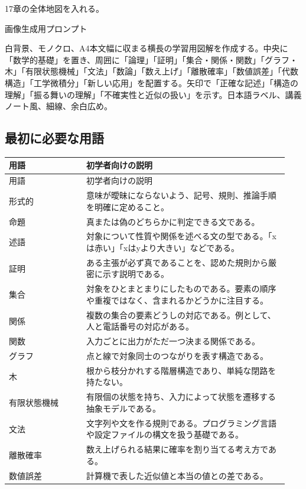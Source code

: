 \documentclass[uplatex,dvipdfmx,a4paper,10pt]{jsarticle}
\begin{document}
\begin{todobox}
17章の全体地図を入れる。

画像生成用プロンプト

白背景、モノクロ、A4本文幅に収まる横長の学習用図解を作成する。中央に「数学的基礎」を置き、周囲に「論理」「証明」「集合・関係・関数」「グラフ・木」「有限状態機械」「文法」「数論」「数え上げ」「離散確率」「数値誤差」「代数構造」「工学微積分」「新しい応用」を配置する。矢印で「正確な記述」「構造の理解」「振る舞いの理解」「不確実性と近似の扱い」を示す。日本語ラベル、講義ノート風、細線、余白広め。
\end{todobox}
\subsection{最初に必要な用語}
\begin{longtable}{>{\raggedright\arraybackslash}p{0.26\linewidth} >{\raggedright\arraybackslash}p{0.68\linewidth}}
\toprule
用語 & 初学者向けの説明 \\
\midrule
\endfirsthead
\toprule
用語 & 初学者向けの説明 \\
\midrule
\endhead
形式的 & 意味が曖昧にならないよう、記号、規則、推論手順を明確に定めること。 \\
命題 & 真または偽のどちらかに判定できる文である。 \\
述語 & 対象について性質や関係を述べる文の型である。「xは赤い」「xはyより大きい」などである。 \\
証明 & ある主張が必ず真であることを、認めた規則から厳密に示す説明である。 \\
集合 & 対象をひとまとまりにしたものである。要素の順序や重複ではなく、含まれるかどうかに注目する。 \\
関係 & 複数の集合の要素どうしの対応である。例として、人と電話番号の対応がある。 \\
関数 & 入力ごとに出力がただ一つ決まる関係である。 \\
グラフ & 点と線で対象同士のつながりを表す構造である。 \\
木 & 根から枝分かれする階層構造であり、単純な閉路を持たない。 \\
有限状態機械 & 有限個の状態を持ち、入力によって状態を遷移する抽象モデルである。 \\
文法 & 文字列や文を作る規則である。プログラミング言語や設定ファイルの構文を扱う基礎である。 \\
離散確率 & 数え上げられる結果に確率を割り当てる考え方である。 \\
数値誤差 & 計算機で表した近似値と本当の値との差である。 \\
\bottomrule
\end{longtable}
\end{document}
